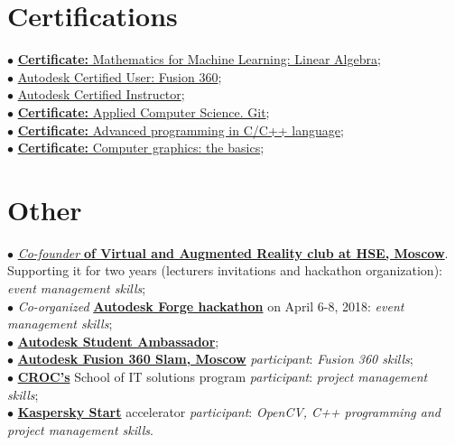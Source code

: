 \documentclass[]{cv-class}
\begin{document}
\begin{minipage}[t]{0.64\textwidth}
\smallSeparator{0.4pt}
\section{Certifications}
    \textcolor{bullet_col}{$\bullet$} \href{https://www.coursera.org/account/accomplishments/certificate/APDHC473Q5H7}{\textbf{Certificate:} Mathematics for Machine Learning: Linear Algebra}; \\
    \textcolor{bullet_col}{$\bullet$} \href{https://www.youracclaim.com/badges/e136c126-c834-408b-b380-beaa949e9180/public_url}{Autodesk Certified User: Fusion 360}; \\
    \textcolor{bullet_col}{$\bullet$} \href{https://www.youracclaim.com/badges/c0436850-b62e-45b4-95fa-6f1b49ca56b6/public_url}{Autodesk Certified Instructor}; \\
    \textcolor{bullet_col}{$\bullet$} \href{https://stepik.org/certificate/86b5b40faf74372730b30f98272ef8a9640ad069.pdf}{\textbf{Certificate:} Applied Computer Science. Git}; \\
    \textcolor{bullet_col}{$\bullet$} \href{https://stepik.org/certificate/93a178ba1662133d84ddb47bed17106eb4a4c8b2.pdf}{\textbf{Certificate:} Advanced programming in C/C++ language}; \\
    \textcolor{bullet_col}{$\bullet$} \href{https://stepik.org/certificate/ffb76dc11c287a0219ffb3e5aee43d2a104bcbb6.pdf}{\textbf{Certificate:} Computer graphics: the basics}; \\
    
\smallSeparator{0.4pt}
\section{Other}
    \textcolor{bullet_col}{$\bullet$} \href{http://family.hse.ru/stud/view/391}{\textit{Co-founder} \textbf{of Virtual and Augmented Reality club at HSE, Moscow}}. Supporting it for two years (lecturers invitations and hackathon organization): \textit{event management skills}; \\
    \textcolor{bullet_col}{$\bullet$} \textit{Co-organized} \href{https://www.hse.ru/ba/am/news/218387792.html}{\textbf{Autodesk Forge hackathon}} on April 6-8, 2018: \textit{event management skills}; \\
    \textcolor{bullet_col}{$\bullet$} \href{https://academy.autodesk.com/users/n1kkys}{\textbf{Autodesk Student Ambassador}}; \\
    \textcolor{bullet_col}{$\bullet$} \href{https://youtu.be/k5R8RdXaOq4}{\textbf{Autodesk Fusion 360 Slam, Moscow}} \textit{participant}: \textit{Fusion 360 skills}; \\
    \textcolor{bullet_col}{$\bullet$} \href{https://www.croc.ru/eng/}{\textbf{CROC's}} School of IT solutions program \textit{participant}: \textit{project management skills}; \\
    \textcolor{bullet_col}{$\bullet$} \href{https://kasperskystart.com}{\textbf{Kaspersky Start}} accelerator \textit{participant}: \textit{OpenCV, C++ programming and project management skills}.

\end{minipage}
\end{document}
